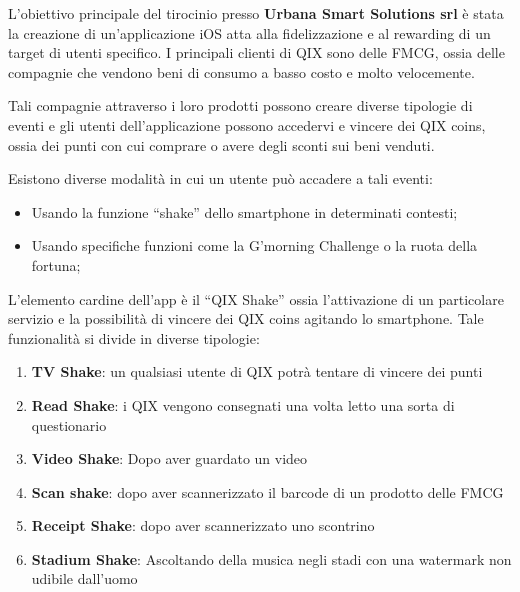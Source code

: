 \normalsize
L’obiettivo principale del tirocinio presso \textbf{Urbana Smart Solutions srl} è stata la creazione di un'applicazione iOS atta alla fidelizzazione e al rewarding di un target di utenti specifico. I principali clienti di QIX sono delle FMCG, ossia delle compagnie che vendono beni di consumo a basso costo e molto velocemente.

Tali compagnie attraverso i loro prodotti possono creare diverse tipologie di eventi e gli utenti dell’applicazione possono accedervi e vincere dei QIX coins, ossia dei punti con cui comprare o avere degli sconti sui beni venduti.

Esistono diverse modalità in cui un utente può accadere a tali eventi:
\begin{itemize}
    \item Usando la funzione “shake” dello smartphone in determinati contesti;
    \item Usando specifiche funzioni come la G'morning Challenge o la ruota della fortuna;
\end{itemize}

L’elemento cardine dell’app è il “QIX Shake” ossia l’attivazione di un particolare servizio e la possibilità di vincere dei QIX coins agitando lo smartphone. Tale funzionalità si divide in diverse tipologie:

\begin{enumerate}
    \item\textbf{TV Shake}: un qualsiasi utente di QIX potrà tentare di vincere dei punti
    \item\textbf{Read Shake}: i QIX vengono consegnati una volta letto una sorta di questionario
    \item\textbf{Video Shake}: Dopo aver guardato un video
    \item\textbf{Scan shake}: dopo aver scannerizzato il barcode di un prodotto delle FMCG
    \item\textbf{Receipt Shake}: dopo aver scannerizzato uno scontrino
    \item\textbf{Stadium Shake}: Ascoltando della musica negli stadi con una watermark non udibile dall'uomo
\end{enumerate}





